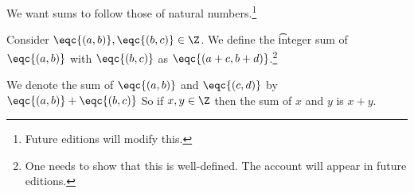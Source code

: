 

We want sums to follow those of natural numbers.\footnote{Future editions will modify this.}


Consider $\eqc{(a, b)}, \eqc{(b, c)} \in \Z$.
We define the \t{integer sum} of $\eqc{(a, b)}$ with $\eqc{(b, c)}$ as $\eqc{(a + c, b + d)}$.\footnote{One needs to show that this is well-defined. The account will appear in future editions.}


We denote the sum of $\eqc{(a, b)}$ and $\eqc{(c, d)}$ by $\eqc{(a, b)} + \eqc{(b, c)}$
So if $x, y \in \Z$ then the sum of $x$ and $y$ is $x + y$.

\blankpage

